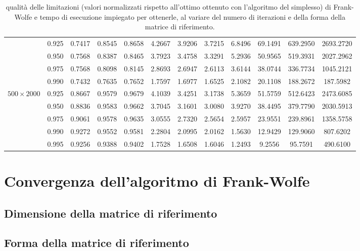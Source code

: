 \begin{landscape}
\begin{table}[!h]
\begin{tabularx}{659.32144pt}{cccccccccccc}
        & 0.925 & 0.7417 & 0.8545 & 0.8658 & 4.2667 & 3.9206 & 3.7215 & 6.8496 & 69.1491 & 639.2950 & 2693.2720 \\
        & 0.950 & 0.7568 & 0.8387 & 0.8465 & 3.7923 & 3.4758 & 3.3291 & 5.2936 & 50.9565 & 519.3931 & 2027.2962 \\
        & 0.975 & 0.7568 & 0.8098 & 0.8145 & 2.8693 & 2.6947 & 2.6113 & 3.6144 & 38.0744 & 336.7734 & 1045.2121 \\
        & 0.990 & 0.7432 & 0.7635 & 0.7652 & 1.7597 & 1.6977 & 1.6525 & 2.1082 & 20.1108 & 188.2672 & 187.5982 \\
        \midrule
        \( 500\times 2000 \)
        & 0.925 & 0.8667 & 0.9579 & 0.9679 & 4.1039 & 3.4251 & 3.1738 & 5.3659 & 51.5759 & 512.6423 & 2473.6085 \\
        & 0.950 & 0.8836 & 0.9583 & 0.9662 & 3.7045 & 3.1601 & 3.0080 & 3.9270 & 38.4495 & 379.7790 & 2030.5913 \\
        & 0.975 & 0.9061 & 0.9578 & 0.9635 & 3.0555 & 2.7320 & 2.5654 & 2.5957 & 23.9551 & 239.8961 & 1358.5758 \\
        & 0.990 & 0.9272 & 0.9552 & 0.9581 & 2.2804 & 2.0995 & 2.0162 & 1.5630 & 12.9429 & 129.9060 & 807.6202 \\
        & 0.995 & 0.9256 & 0.9388 & 0.9402 & 1.7528 & 1.6508 & 1.6046 & 1.2493 & 9.2556 & 95.7591 & 490.6100 \\
        \bottomrule
    \end{tabularx}
    \caption{qualità delle limitazioni (valori normalizzati rispetto all'ottimo ottenuto con l'algoritmo del simplesso)
    di Frank-Wolfe e tempo di esecuzione impiegato per ottenerle, al variare del numero di iterazioni e della forma
    della matrice di riferimento.}
    \label{table:hugetable4}
\end{table}
\end{landscape}

\section{Convergenza dell'algoritmo di Frank-Wolfe}

\subsection{Dimensione della matrice di riferimento}
\subsection{Forma della matrice di riferimento}

